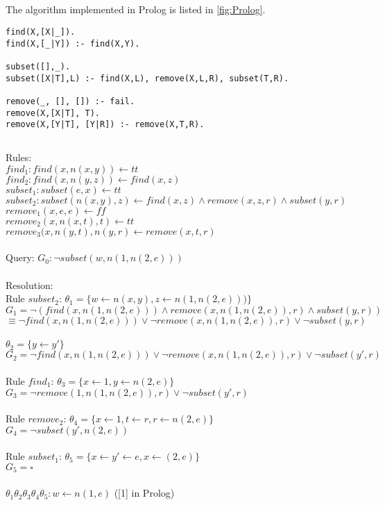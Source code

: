 \documentclass[]{article}
\begin{document}
\subsection{}
The algorithm implemented in Prolog is listed in \ref{fig:Prolog}.
\begin{lstlisting}[frame=single,caption={The code for $subset(L1,L2)$ in Prolog}]
find(X,[X|_]).
find(X,[_|Y]) :- find(X,Y).

subset([],_).
subset([X|T],L) :- find(X,L), remove(X,L,R), subset(T,R).

remove(_, [], []) :- fail.
remove(X,[X|T], T).
remove(X,[Y|T], [Y|R]) :- remove(X,T,R).
\end{lstlisting}
\label{fig:Prolog}
\subsection{}
Rules:\\
$find_1: find(x,n(x,y)) \leftarrow tt$\\
$find_2: find(x,n(y,z)) \leftarrow find(x,z)$\\
$subset_1: subset(e,x) \leftarrow tt$\\
$subset_2: subset(n(x,y), z) \leftarrow find(x,z)  \wedge remove(x,z,r) \wedge subset(y,r)$\\
$remove_1(x,e, e) \leftarrow ff$\\
$remove_2(x,n(x,t),t) \leftarrow tt$\\
$remove_3(x,n(y,t),n(y,r) \leftarrow remove(x,t,r)$\\ \\
Query: $G_0:\neg subset(w,n(1,n(2,e)))$\\ \\
Resolution:\\
Rule $subset_2$: $\theta_1= \{w\leftarrow n(x,y), z\leftarrow n(1,n(2,e)))\}$\\
$G_1=\neg(find(x,n(1,n(2,e))) \wedge remove(x,n(1,n(2,e)),r)\wedge subset(y,r))$\\
$\equiv \neg find(x,n(1,n(2,e))) \vee\neg remove(x,n(1,n(2,e)),r)\vee\neg subset(y,r)$\\ \\
$\theta_2= \{y\leftarrow y'\}$\\
$G_2 = \neg find(x,n(1,n(2,e))) \vee\neg remove(x,n(1,n(2,e)),r)\vee\neg subset(y',r)$\\ \\
Rule $find_1$: $\theta_3=\{x\leftarrow 1, y\leftarrow n(2,e)\}$\\
$G_3 = \neg remove(1,n(1,n(2,e)),r)\vee\neg subset(y',r)$\\ \\
Rule $remove_2$: $\theta_4=\{x\leftarrow 1, t\leftarrow r, r\leftarrow n(2,e)\}$\\
$G_4 = \neg subset(y',n(2,e))$\\ \\
Rule $subset_1$: $\theta_5 = \{x\leftarrow y'\leftarrow e, x\leftarrow(2,e)\}$\\
$G_5 = \square$\\ \\
$\theta_1\theta_2\theta_3\theta_4\theta_5: w \leftarrow n(1,e)$ ([1] in Prolog)
\end{document}
